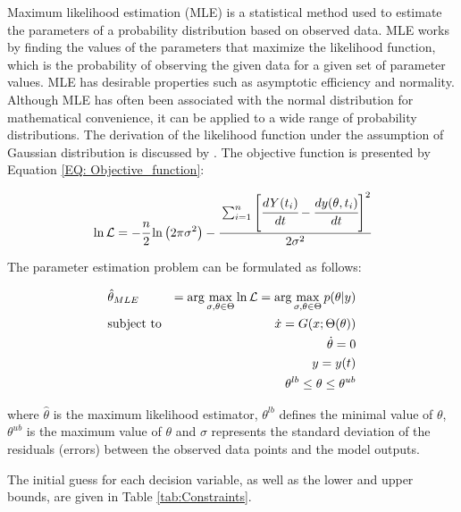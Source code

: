 \documentclass[a4paper,fleqn]{cas-dc}
\begin{document}
Maximum likelihood estimation (MLE) is a statistical method used to estimate the parameters of a probability distribution based on observed data. MLE works by finding the values of the parameters that maximize the likelihood function, which is the probability of observing the given data for a given set of parameter values. MLE has desirable properties such as asymptotic efficiency and normality. Although MLE has often been associated with the normal distribution for mathematical convenience, it can be applied to a wide range of probability distributions. The derivation of the likelihood function under the assumption of  Gaussian distribution is discussed by \citet{Himmelblau1970}. The objective function is presented by Equation \ref{EQ: Objective_function}:

{\footnotesize
	\begin{equation} \label{EQ: Objective_function}
		\ln \mathcal{L} = -\cfrac{n}{2}  \ln \left(2 \pi \sigma^2\right) 
		- \cfrac{ \sum_{i=1}^{n} \left[  \cfrac{d {Y}(t_i)}{dt} - \cfrac{dy(\theta, t_i)}{dt} \right]^2 }{2 \sigma^2}
	\end{equation}
}

The parameter estimation problem can be formulated as follows:

{\footnotesize
	\begin{equation}
		\begin{aligned} \label{EQ: Optimization_formulation_MLE}
			&\hat{\theta}_{MLE} &= \arg \max_{\sigma, \theta \in \Theta} \ln \mathcal{L} = \arg \max_{\sigma,\theta \in \Theta} p(\theta|y) \\
			&\text{subject to}
			& \dot{ x } = G({\color{black} x};\Theta(\theta)) \\
			&& \dot{\theta} = 0 \\
			&& y = y(t) \\
			&& \theta^{lb} \leq \theta \leq \theta^{ub}
		\end{aligned}
\end{equation} } 

where $\hat{\theta}$ is the maximum likelihood estimator, $\theta^{lb}$ defines the minimal value of $\theta$, $\theta^{ub}$ is the maximum value of $\theta$ and $\sigma$ represents the standard deviation of the residuals (errors) between the observed data points and the model outputs.

The initial guess for each decision variable, as well as the lower and upper bounds, are given in Table \ref{tab:Constraints}. 
\end{document}
